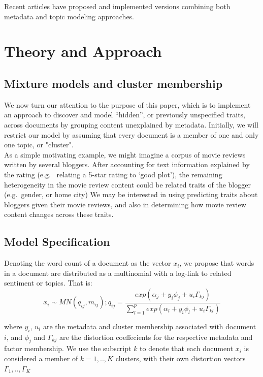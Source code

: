 \documentclass[12pt]{article}
\begin{document}
Recent articles have proposed and implemented versions combining both
metadata and topic modeling approaches.

\section{Theory and Approach}\label{theory-and-approach}

\subsection{Mixture models and cluster
membership}\label{mixture-models-and-cluster-membership}

We now turn our attention to the purpose of this paper, which is to
implement an approach to discover and model ``hidden'', or previously
unspecified traits, across documents by grouping content unexplained by
metadata. Initially, we will restrict our model by assuming that every document is a member of one and only one topic, or "cluster". 
\\As a simple motivating example, we might imagine a corpus of
movie reviews written by several bloggers. After accounting for text
information explained by the rating (e.g. ~relating a 5-star rating to
`good plot'), the remaining heterogeneity in the movie review
content could be related traits of the blogger (e.g.~gender, or home
city) We may be interested in using predicting traits about bloggers
given their movie reviews, and also in determining how movie review
content changes across these traits.

\subsection{Model Specification}\label{model-specification}

Denoting the word count of a document as the vector $x_i$, we propose
that words in a document are distributed as a multinomial with a
log-link to related sentiment or topics. That is:
\[ x_{i} \sim MN(q_{ij},m_{ij}) ; q_{ij} = \frac{exp(\alpha_j + y_i \phi_j + u_i \Gamma_{kj})}{\sum_{l=1}^{p}{exp(\alpha_l+ y_i \phi_l + u_i \Gamma_{kl})}}\]

where $y_i$, $u_i$ are the metadata and cluster membership associated
with document $i$, and $\phi_j$ and $\Gamma_{kj}$ are the distortion
coeffecients for the respective metadata and factor membership. We use
the subscript $k$ to denote that each document $x_i$ is considered a
member of $k = 1,..,K$ clusters, with their own distortion vectors
$\Gamma_1,..,\Gamma_K$
\end{document}
